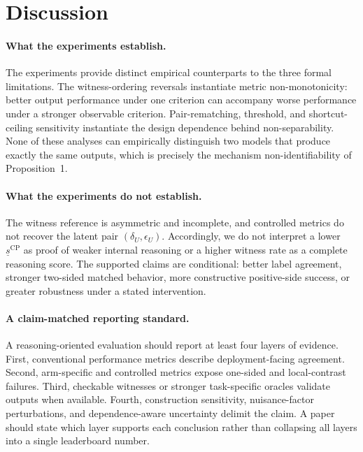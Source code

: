 \documentclass[acmsmall,screen,review,anonymous]{acmart}
\providecommand{\SepCP}{\underline{s}^{\mathrm{CP}}}
\newcounter{experiment}
\begin{document}
\section{Discussion}

\paragraph{What the experiments establish.}
The experiments provide distinct empirical counterparts to the three formal
limitations. The witness-ordering reversals instantiate metric
non-monotonicity: better output performance under one criterion can accompany
worse performance under a stronger observable criterion. Pair-rematching,
threshold, and shortcut-ceiling sensitivity instantiate the design dependence
behind non-separability. None of these
analyses can empirically distinguish two models that produce exactly the same
outputs, which is precisely the mechanism non-identifiability of
Proposition~1.

\paragraph{What the experiments do not establish.}
The witness reference is asymmetric and incomplete, and controlled metrics do
not recover the latent pair
\((\delta_U,\epsilon_U)\). Accordingly, we do not interpret a lower
\(\SepCP\) as proof of weaker internal reasoning or a higher witness rate as a
complete reasoning score. The supported claims are conditional: better label
agreement, stronger two-sided matched behavior, more constructive
positive-side success, or greater robustness under a stated intervention.

\paragraph{A claim-matched reporting standard.}
A reasoning-oriented evaluation should report at least four layers of
evidence. First, conventional performance metrics describe deployment-facing
agreement. Second, arm-specific and controlled metrics expose one-sided and
local-contrast failures. Third, checkable witnesses or stronger task-specific
oracles validate outputs when available. Fourth, construction sensitivity,
nuisance-factor perturbations, and dependence-aware uncertainty delimit the
claim. A paper should state which layer supports each conclusion rather than
collapsing all layers into a single leaderboard number.
\end{document}
